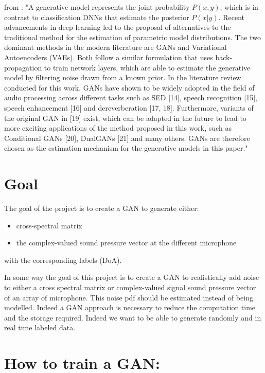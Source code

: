 \documentclass{article}
\begin{document}
from \cite{papayiannis2019data}: "A generative model represents the joint probability $P(x, y)$, which is in contrast to classification DNNs that estimate the posterior $P(x|y)$. Recent advancements in deep learning led to the proposal of alternatives to the traditional method for the estimation of parametric model distributions. The two dominant methods in the modern literature are GANs and Variational Autoencoders (VAEs). Both follow a similar formulation that uses back-propagation to train network layers, which are able to estimate the generative model by filtering noise drawn from a known prior. In the literature review conducted for this work, GANs have shown to be widely adopted in the field of audio processing across different tasks such as SED [14], speech recognition [15], speech enhancement [16] and dereverberation [17, 18]. Furthermore, variants of the original GAN in [19] exist, which can be adapted in the future to lead to more exciting applications of the method proposed in this work, such as Conditional GANs [20], DualGANs [21] and many others. GANs are therefore chosen as the estimation mechanism for the generative models in this paper."



\section{Goal}

The goal of the project is to create a GAN to generate either:
\begin{itemize}
    \item cross-spectral matrix
    \item the complex-valued sound pressure vector at the different microphone
\end{itemize}
with the corresponding labels (DoA).

In some way the goal of this project is to create a GAN to realistically add noise to either a cross spectral matrix or complex-valued signal sound pressure vector of an array of microphone. This noise pdf should be estimated instead of being modelled. Indeed a GAN approach is necessary to reduce the computation time and the storage required. Indeed we want to be able to generate randomly and in real time labeled data.  

\section{How to train a GAN:}
\end{document}
